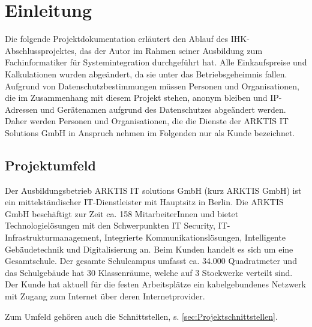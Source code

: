 \newpage
\section{Einleitung}
\label{sec:Einleitung}
Die folgende Projektdokumentation erläutert den Ablauf des IHK-Abschlussprojektes, das der Autor im Rahmen seiner Ausbildung zum Fachinformatiker für Systemintegration durchgeführt hat. 
Alle Einkaufspreise und Kalkulationen wurden abgeändert, da sie unter das Betriebsgeheimnis fallen. 
Aufgrund von Datenschutzbestimmungen müssen Personen und Organisationen, die im Zusammenhang mit diesem Projekt stehen, anonym bleiben und IP-Adressen und Gerätenamen aufgrund des Datenschutzes abgeändert werden. 
 Daher werden Personen und Organisationen, die die Dienste der ARKTIS IT Solutions GmbH in Anspruch nehmen im Folgenden nur als Kunde bezeichnet. 

\subsection{Projektumfeld} 
\label{sec:Projektumfeld}
Der Ausbildungsbetrieb ARKTIS IT solutions GmbH (kurz ARKTIS GmbH) ist ein mittelständischer IT-Dienstleister mit Hauptsitz in Berlin. Die ARKTIS GmbH beschäftigt zur Zeit ca. 158 MitarbeiterInnen und bietet Technologielösungen mit den Schwerpunkten IT Security, IT-Infrastrukturmanagement, Integrierte Kommunikationslösungen, Intelligente Gebäudetechnik und Digitalisierung an. Beim Kunden handelt es sich um eine Gesamtschule. Der gesamte Schulcampus umfasst ca. 34.000 Quadratmeter und das Schulgebäude hat 30 Klassenräume, welche auf 3 Stockwerke verteilt sind. Der Kunde hat aktuell für die festen Arbeitsplätze ein kabelgebundenes Netzwerk mit Zugang zum Internet über deren Internetprovider.   

Zum Umfeld gehören auch die Schnittstellen, s. \ref{sec:Projektschnittstellen}.

